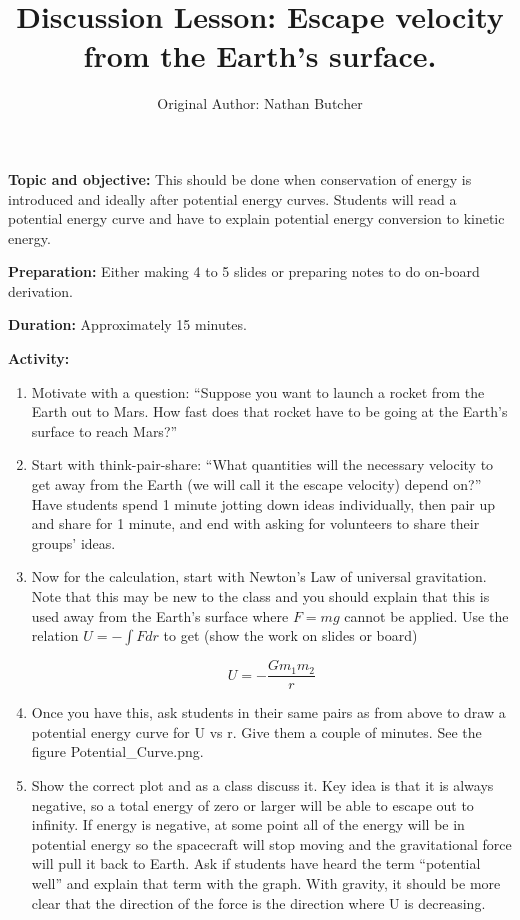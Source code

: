 \documentclass{article}
\title{Discussion Lesson: Escape velocity from the Earth's surface.}
\author{Original Author: Nathan Butcher}
\date{}
\begin{document}
\maketitle
\thispagestyle{empty}

\textbf{Topic and objective:} This should be done when conservation of energy is introduced and ideally after potential energy curves. Students will read a potential energy curve and have to explain potential energy conversion to kinetic energy.

\textbf{Preparation:} Either making 4 to 5 slides or preparing notes to do on-board derivation. 

\textbf{Duration:} Approximately 15 minutes. 

\hspace{14pt}

\textbf{Activity:}
\begin{enumerate}
\item Motivate with a question: ``Suppose you want to launch a rocket from the Earth out to Mars. How fast does that rocket have to be going at the Earth's surface to reach Mars?''

\item Start with think-pair-share: ``What quantities will the necessary velocity to get away from the Earth (we will call it the escape velocity) depend on?'' Have students spend 1 minute jotting down ideas individually, then pair up and share for 1 minute, and end with asking for volunteers to share their groups' ideas.

\item Now for the calculation, start with Newton's Law of universal gravitation. Note that this may be new to the class and you should explain that this is used away from the Earth's surface where $F = mg$ cannot be applied. Use the relation $U = - \int F dr$ to get (show the work on slides or board) 

\begin{equation}
U = - \frac{G m_1 m_2}{r}
\end{equation}

\item Once you have this, ask students in their same pairs as from above to draw a potential energy curve for U vs r. Give them a couple of minutes. See the figure Potential\_Curve.png.

\item Show the correct plot and as a class discuss it. Key idea is that it is always negative, so a total energy of zero or larger will be able to escape out to infinity. If energy is negative, at some point all of the energy will be in potential energy so the spacecraft will stop moving and the gravitational force will pull it back to Earth. Ask if students have heard the term ``potential well'' and explain that term with the graph. With gravity, it should be more clear that the direction of the force is the direction where U is decreasing.


\end{enumerate}
\end{document}
